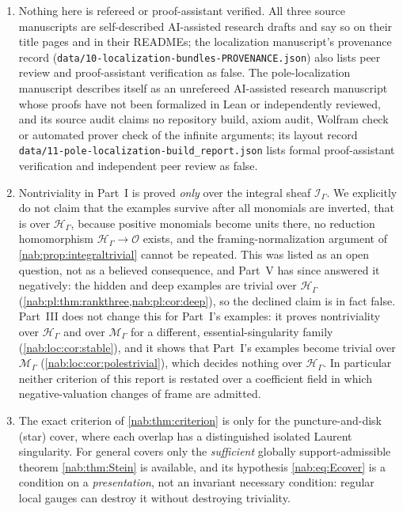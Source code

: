 \documentclass[11pt,letterpaper]{article}
\theoremstyle{definition}
\theoremstyle{remark}
\newcommand{\OO}{\mathcal O}
\newcommand{\HH}{\mathscr H_\Gamma}
\newcommand{\II}{\mathscr I_\Gamma}
\newcommand{\MM}{\mathscr M_\Gamma}
\numberwithin{equation}{section}
\begin{document}
\begin{enumerate}
\item\label{nab:nc:refereed}
Nothing here is refereed or proof-assistant verified. All three source
manuscripts are self-described AI-assisted research drafts and say so on their
title pages and in their READMEs; the localization manuscript's provenance
record (\nolinkurl{data/10-localization-bundles-PROVENANCE.json}) also lists
peer review and proof-assistant verification as false. The pole-localization
manuscript describes itself as an unrefereed AI-assisted research manuscript
whose proofs have not been formalized in Lean or independently reviewed, and
its source audit claims no repository build, axiom audit, Wolfram check or
automated prover check of the infinite arguments; its layout record
\nolinkurl{data/11-pole-localization-build_report.json} lists formal
proof-assistant verification and independent peer review as false.

\item\label{nab:nc:localization}
Nontriviality in Part~I is proved \emph{only} over the integral sheaf $\II$.
We explicitly do not claim that the examples survive after all monomials are
inverted, that is over $\HH$, because positive monomials become units there,
no reduction homomorphism $\HH\to\OO$ exists, and the framing-normalization
argument of \cref{nab:prop:integraltrivial} cannot be repeated. This was
listed as an open question, not as a believed consequence, and Part~V has since
answered it negatively: the hidden and deep examples are trivial over $\HH$
(\cref{nab:pl:thm:rankthree,nab:pl:cor:deep}), so the declined claim is in fact
false. Part~III does not change this for Part~I's examples: it proves nontriviality over $\HH$ and over $\MM$
for a different, essential-singularity family (\cref{nab:loc:cor:stable}), and
it shows that Part~I's examples become trivial over $\MM$
(\cref{nab:loc:cor:polestrivial}), which decides nothing over $\HH$. In
particular neither criterion of this report is restated over a coefficient
field in which negative-valuation changes of frame are admitted.

\item\label{nab:nc:starcover}
The exact criterion of \cref{nab:thm:criterion} is only for the
puncture-and-disk (star) cover, where each overlap has a distinguished isolated
Laurent singularity. For general covers only the \emph{sufficient} globally
support-admissible theorem \cref{nab:thm:Stein} is available, and its
hypothesis \eqref{nab:eq:Ecover} is a condition on a \emph{presentation}, not
an invariant necessary condition: regular local gauges can destroy it without
destroying triviality.


\end{enumerate}
\end{document}
